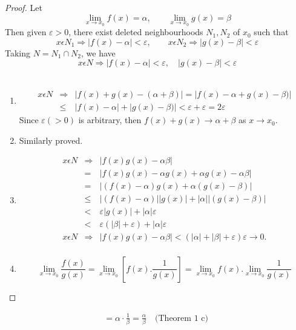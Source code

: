 \documentclass[11pt]{amsbook}
\begin{document}
\begin{proof}	Let  
\[ \lim_{x \to x_{0}} f(x)=\alpha,\qquad   \lim_{x \to x_{0}} g(x)=\beta\] 
Then given $\varepsilon >0$, there exist deleted neighbourhoods $N_{1}, N_{2}$ of $x_{0}$ such that
 \[ x\epsilon N_{1} \Rightarrow |f(x)-\alpha|<\varepsilon, \qquad x\epsilon N_{2} \Rightarrow |g(x)-\beta|<\varepsilon \] 
 Taking $N=N_{1}\cap N_{2}$, we have 
 \[ x\epsilon N \Rightarrow |f(x)-\alpha|<\varepsilon, \quad  |g(x)-\beta|<\varepsilon  \] \\ 
\begin{enumerate}[label=\alph*) ,leftmargin=*,topsep=-10pt,partopsep=0pt,parsep=0pt,itemsep=0pt]
\item \begin{eqnarray*} x\epsilon N &\Rightarrow& |f(x)+g(x)-(\alpha+\beta)| = |f(x)-\alpha+g(x)-\beta)|\\  &\leq & |f(x)-\alpha|+|g(x)-\beta)|< \varepsilon+\varepsilon=2\varepsilon \end{eqnarray*} 
Since $\varepsilon(>0)$ is arbitrary, then $f(x)+g(x)\rightarrow \alpha+\beta$ as $x\rightarrow x_{0}$. \\
\item Similarly proved.\\
\item \begin{eqnarray*}
 x\epsilon N &\Rightarrow& |f(x)g(x)-\alpha\beta|  \\
   &=& |f(x)g(x)-\alpha g(x)+\alpha g(x)-\alpha\beta| \\
   &=& |(f(x)-\alpha)g(x)+\alpha(g(x)-\beta)| \\
   &\leq& |(f(x)-\alpha)||g(x)|+|\alpha||(g(x)-\beta)|\\
   &<& \varepsilon|g(x)|+|\alpha|\varepsilon\\
   &<& \varepsilon(|\beta|+\varepsilon)+|\alpha|\varepsilon\\
 x\epsilon N&\Rightarrow&|f(x)g(x)-\alpha\beta|<(|\alpha|+|\beta|+\varepsilon)\varepsilon\rightarrow 0.\\
\end{eqnarray*}
\item \begin{equation} \lim_{x \to x_{0}} \frac{f(x)}{g(x)}=\lim_{x \to x_{0}}[f(x).\frac{1}{g(x)}]= \lim_{x \to x_{0}}f(x).\lim_{x \to x_{0}} \frac{1}{g(x)} \end{equation}

\end{enumerate}

\end{proof}
\begin{gather*}
= \alpha \cdot \frac{1}{\beta} = \frac{\alpha}{\beta} \quad \text {(Theorem 1 c) }
\end{gather*}
\end{document}
